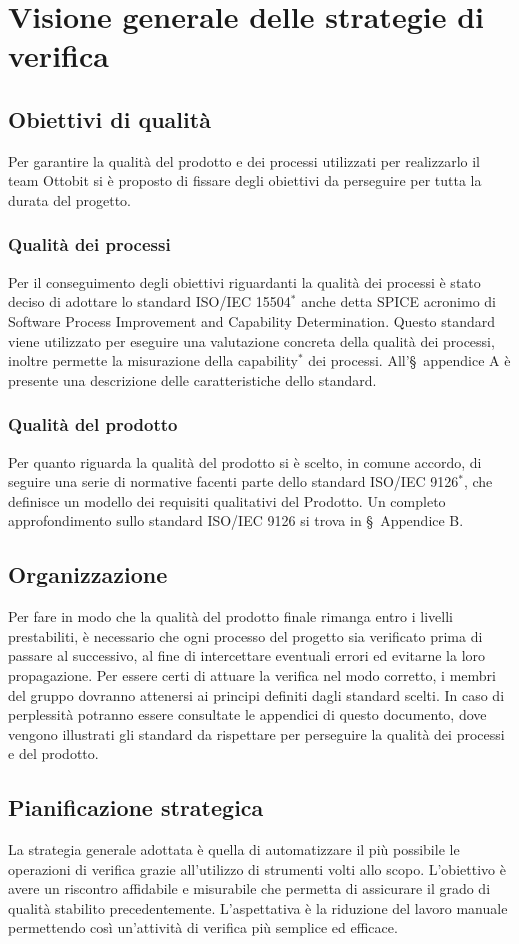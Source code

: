 \section{Visione generale delle strategie di verifica}
\subsection{Obiettivi di qualità}
	Per garantire la qualità del prodotto e dei processi utilizzati per realizzarlo il team Ottobit si è proposto di fissare degli obiettivi da perseguire per tutta la durata del progetto.
	\subsubsection{Qualità dei processi}
	Per il conseguimento degli obiettivi riguardanti la qualità dei processi è stato deciso di adottare lo standard ISO/IEC 15504$^*$ anche detta SPICE acronimo di Software Process Improvement and Capability Determination. Questo standard viene utilizzato per eseguire una valutazione concreta della qualità dei processi, inoltre permette la misurazione della capability$^*$ dei processi. All'\S\ appendice A è presente una descrizione delle caratteristiche dello standard.
	\subsubsection{Qualità del prodotto}
		Per quanto riguarda la qualità del prodotto si è scelto, in comune accordo, di seguire una serie di normative facenti parte dello standard ISO/IEC 9126$^*$, che definisce un modello dei requisiti qualitativi del Prodotto. Un completo approfondimento sullo standard ISO/IEC 9126 si trova in \S\ Appendice B.
\subsection{Organizzazione}
Per fare in modo che la qualità del prodotto finale rimanga entro i livelli prestabiliti, è necessario che ogni processo del progetto sia verificato prima di passare al successivo, al fine di intercettare eventuali errori ed evitarne la loro propagazione. Per essere certi di attuare la verifica nel modo corretto, i membri del gruppo dovranno attenersi ai principi definiti dagli standard scelti. In caso di perplessità potranno essere consultate le appendici di questo documento, dove vengono illustrati gli standard da rispettare per perseguire la qualità dei processi e del prodotto.

\subsection{Pianificazione strategica}
La strategia generale adottata è quella di automatizzare il più possibile le operazioni di verifica grazie all'utilizzo di strumenti volti allo scopo. L'obiettivo è avere un riscontro affidabile e misurabile che permetta di assicurare il grado di qualità stabilito precedentemente.  L'aspettativa è la riduzione del lavoro manuale permettendo così un'attività di verifica più semplice ed efficace.

